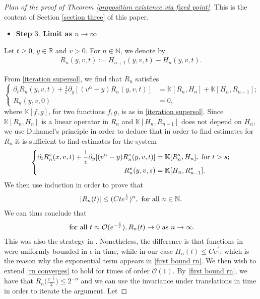 \documentclass[11pt]{article}
\numberwithin{equation}{section}
\begin{document}
\begin{proof}[Plan of the proof of Theorem \ref{proposition existence via fixed point}]
This is the content of Section \ref{section three} of this paper.
\begin{itemize}
    \item \textbf{Step $3.$ Limit as $n\rightarrow\infty$} 
\end{itemize}
Let $t\geq 0$, $y\in\mathbb{R}$ and $v> 0$. For $n\in\mathbb{N}$, we denote by 
\begin{align}
R_n(y,v,t):=H_{n+1}(y,v,t)-H_n(y,v,t).
\end{align}

From \eqref{iteration supersol}, we find that $R_{n}$ satisfies
\begin{equation}
\left\{\begin{aligned}
\partial_t R_n(y,v,t)+\frac{1}{\epsilon}\partial_y[(v^{\alpha}-y) R_n(y,v,t)]&=\mathbb{K}[R_n,H_{n}]+\mathbb{K}[H_{n},R_{n-1}]; \\
R_{n}(y,v,0)&=0,
   \end{aligned}\right.
   \end{equation}
where $\mathbb{K}[f,g]$, for two functions $f,g$, is as in \eqref{iteration supersol}. Since $\mathbb{K}[R_n,H_{n}]$ is a linear operator in $R_{n}$ and $\mathbb{K}[H_{n},R_{n-1}]$ does not depend on $H_{n}$, we use Duhamel's principle in order to deduce that in order to find estimates for $R_{n}$  it is sufficient to find estimates for the system
    \begin{equation}
\left\{\begin{aligned}
\partial_t R^{s}_n(x,v,t)+\frac{1}{\epsilon}\partial_y[(v^{\alpha}-y) R^{s}_n(y,v,t)]&=\mathbb{K}[R^{s}_n,H_{n}], \textup{ for } t>s; \\
R^{s}_{n}(y,v,s)&=\mathbb{K}[H_{n},R^{s}_{n-1}].
   \end{aligned}\right.
   \end{equation}
We then use induction in order to prove that
\begin{align}\label{first bound rn}
    |R_{n}(t)|\leq (Cte^{\frac{1}{\epsilon}})^{n}, \textup{ for all } n\in\mathbb{N}.
\end{align}
We can thus conclude that 
\begin{align}\label{rn converges}
    \textup{ for all } t\approx\mathcal{O}(e^{-\frac{1}{\epsilon}}),  R_{n}(t)\rightarrow 0 \textup{ as } n\rightarrow\infty.
\end{align} This was also the strategy in \cite{cristianinhom}. Nonetheless, the difference is that functions in \cite{cristianinhom} were uniformly bounded in $\epsilon$ in time, while in our case $H_{n}(t)\leq Ce^{\frac{t}{\epsilon}}$, which is the reason why the exponential term appears in \eqref{first bound rn}. We then wish to extend \eqref{rn converges} to hold for times of order $\mathcal{O}(1)$. By \eqref{first bound rn}, we have that $R_{n}\big(\frac{e^{-\frac{1}{\epsilon}}}{2}\big)\leq 2^{-n}$ and we can use the invariance under translations in time in order to iterate the argument. Let

\end{proof}
\end{document}
